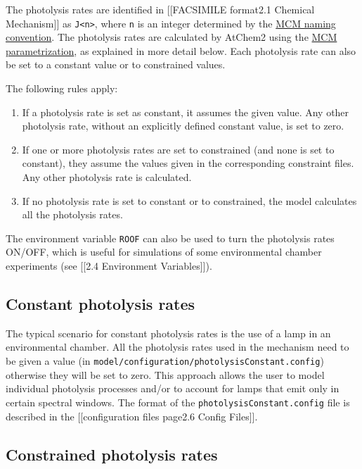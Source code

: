 The photolysis rates are identified in {[}{[}FACSIMILE
format\textbar{}2.1 Chemical Mechanism{]}{]} as
\texttt{J\textless{}n\textgreater{}}, where \texttt{n} is an integer
determined by the
\href{http://mcm.leeds.ac.uk/MCMv3.3.1/parameters/photolysis.htt}{MCM
naming convention}. The photolysis rates are calculated by AtChem2
using the
\href{http://mcm.leeds.ac.uk/MCM/parameters/photolysis_param.htt}{MCM
parametrization}, as explained in more detail below. Each photolysis
rate can also be set to a constant value or to constrained values.

The following rules apply:

\begin{enumerate}
\item If a photolysis rate is set as constant, it assumes the given
value.  Any other photolysis rate, without an explicitly defined
constant value, is set to zero.
\item If one or more photolysis rates are set to constrained (and none
is set to constant), they assume the values given in the corresponding
constraint files. Any other photolysis rate is calculated.
\item If no photolysis rate is set to constant or to constrained, the
model calculates all the photolysis rates.
\end{enumerate}

The environment variable \texttt{ROOF} can also be used to turn the
photolysis rates ON/OFF, which is useful for simulations of some
environmental chamber experiments (see {[}{[}2.4 Environment
Variables{]}{]}).

\subsection{Constant photolysis rates} \label{subsec:constant-photolysis-rates}

The typical scenario for constant photolysis rates is the use of a
lamp in an environmental chamber. All the photolysis rates used in the
mechanism need to be given a value (in
\texttt{model/configuration/photolysisConstant.config}) otherwise they
will be set to zero. This approach allows the user to model individual
photolysis processes and/or to account for lamps that emit only in
certain spectral windows. The format of the
\texttt{photolysisConstant.config} file is described in the
{[}{[}configuration files page\textbar{}2.6 Config Files{]}{]}.

\subsection{Constrained photolysis rates} \label{subsec:constrained-photolysis-rates}

